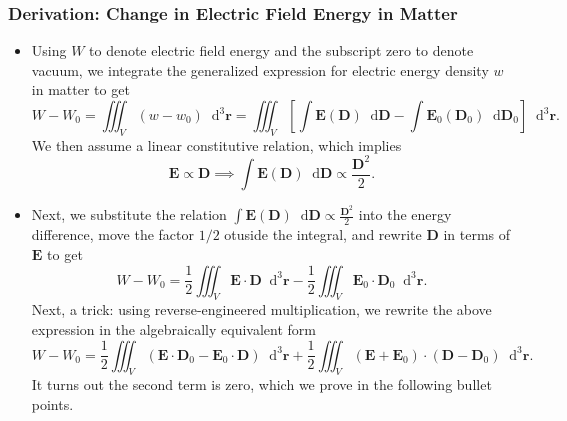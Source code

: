 \documentclass[11pt, a4paper]{article}
\newcommand{\diff}{\mathop{}\!\mathrm{d}} %
\newcommand{\dr}{\diff^{3} \r}  %
\renewcommand{\vec}[1]{\bm{#1}} %
\renewcommand{\r}{\vec{r}}
\newcommand{\E}{\vec{E}} %
\newcommand{\D}{\vec{D}}  %
\begin{document}
\subsubsection{Derivation: Change in Electric Field Energy in Matter}
\begin{itemize}
	
	\item Using $ W $ to denote electric field energy and the subscript zero to denote vacuum, we integrate the generalized expression for electric energy density $ w $ in matter to get
	\begin{equation*}
        W - W_{0} = \iiint_{V}(w - w_{0})\dr = \iiint_{V} \left[\int \E(\D) \diff \D - \int \E_{0}(\D_{0}) \diff \D_{0} \right] \dr.
	\end{equation*}
	We then assume a linear constitutive relation, which implies
	\begin{equation*}
		\E \propto \D \implies \int \E(\D) \diff \D \propto \frac{\D^{2}}{2}.
	\end{equation*}

    \item Next, we substitute the relation $ \int \E(\D) \diff \D \propto \frac{\D^{2}}{2} $ into the energy difference, move the factor $ 1/2 $ otuside the integral, and rewrite $ \D $ in terms of $ \E $ to get
	\begin{equation*}
		W - W_{0} = \frac{1}{2}\iiint_{V} \E \cdot \D \dr - \frac{1}{2}\iiint_{V}\E_{0}\cdot \D_{0}\dr.
	\end{equation*}
	Next, a trick: using reverse-engineered multiplication, we rewrite the above expression in the algebraically equivalent form
	\begin{equation*}
		W - W_{0} = \frac{1}{2}\iiint_{V}(\E \cdot \D_{0} - \E_{0}\cdot\D)\dr + \frac{1}{2}\iiint_{V}(\E + \E_{0})\cdot (\D - \D_{0})\dr.
	\end{equation*}
    It turns out the second term is zero, which we prove in the following bullet points.


\end{itemize}
\end{document}
